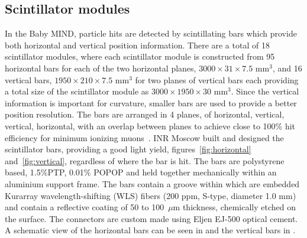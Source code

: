 \subsection{Scintillator modules}
In the Baby MIND, particle hits are detected by scintillating bars which provide both horizontal and vertical position information. There are a total of 18 scintillator modules, where each scintillator module is constructed from 95 horizontal bars for each of the two horizontal planes, $3000 \times 31 \times 7.5$ mm$^3$, and 16 vertical bars, $1950 \times 210 \times 7.5$ mm$^3$ for two planes of vertical bars each providing a total size of the scintillator module as $3000 \times 1950 \times 30$ mm$^3$. Since the vertical information is important for curvature, smaller bars are used to provide a better position resolution. The bars are arranged in 4 planes, of horizontal, vertical, vertical, horizontal, with an overlap between planes to achieve close to 100\% hit efficiency for minimum ionizing muons~\cite{51Saba}. INR Moscow built and designed the scintillator bars, providing a good light yield, figures~\ref{fig:horizontal} and~\ref{fig:vertical}, regardless of where the bar is hit. The bars are polystyrene based, 1.5\%PTP, 0.01\% POPOP and held together mechanically within an aluminium support frame. The bars contain a groove within which are embedded Kurarray wavelength-shifting (WLS) fibers (200 ppm, S-type, diameter 1.0 mm) and contain a reflective coating of 50 to 100~$\mu$m thickness, chemically etched on the surface. The connectors are custom made using Eljen EJ-500 optical cement. A schematic view of the horizontal bars can be seen in  and the vertical bars in . 




